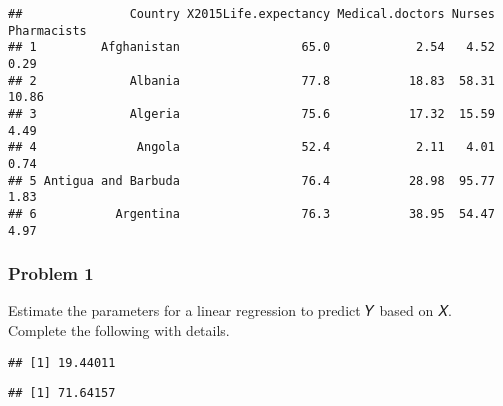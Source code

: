 \documentclass[
]{article}
\newenvironment{Shaded}{\begin{snugshade}}{\end{snugshade}}
\newcommand{\CommentTok}[1]{\textcolor[rgb]{0.56,0.35,0.01}{\textit{#1}}}
\newcommand{\FunctionTok}[1]{\textcolor[rgb]{0.13,0.29,0.53}{\textbf{#1}}}
\newcommand{\NormalTok}[1]{#1}
\newcommand{\OtherTok}[1]{\textcolor[rgb]{0.56,0.35,0.01}{#1}}
\newcommand{\SpecialCharTok}[1]{\textcolor[rgb]{0.81,0.36,0.00}{\textbf{#1}}}
\begin{document}
\begin{verbatim}
##               Country X2015Life.expectancy Medical.doctors Nurses Pharmacists
## 1         Afghanistan                 65.0            2.54   4.52        0.29
## 2             Albania                 77.8           18.83  58.31       10.86
## 3             Algeria                 75.6           17.32  15.59        4.49
## 4              Angola                 52.4            2.11   4.01        0.74
## 5 Antigua and Barbuda                 76.4           28.98  95.77        1.83
## 6           Argentina                 76.3           38.95  54.47        4.97
\end{verbatim}

\subsubsection{Problem 1}\label{problem-1}

Estimate the parameters for a linear regression to predict 𝑌 based on 𝑋.
Complete the following with details.

\begin{Shaded}
\end{Shaded}

\begin{verbatim}
## [1] 19.44011
\end{verbatim}

\begin{Shaded}
\end{Shaded}

\begin{verbatim}
## [1] 71.64157
\end{verbatim}

\begin{Shaded}
\end{Shaded}
\end{document}
